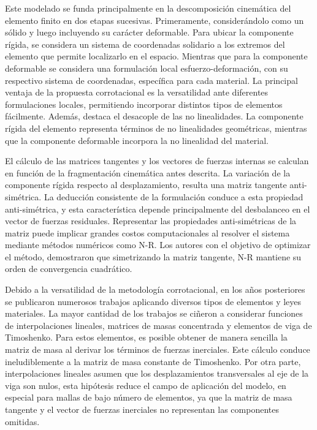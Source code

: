 Este modelado se funda principalmente en la descomposición cinemática del elemento finito en dos etapas sucesivas. Primeramente, considerándolo como un sólido y luego incluyendo su carácter deformable. Para ubicar la componente rígida, se considera un sistema de coordenadas solidario a los extremos del elemento que permite localizarlo en el espacio. Mientras que para la componente deformable se considera una formulación local esfuerzo-deformación, con su respectivo sistema de coordenadas, específica para cada material. La principal ventaja de la propuesta corrotacional es la versatilidad ante diferentes formulaciones locales, permitiendo incorporar distintos tipos de elementos fácilmente. Además, destaca el desacople de las no linealidades. La componente rígida del elemento representa términos de no linealidades geométricas, mientras que la componente deformable incorpora la no linealidad del material. 

El cálculo de las matrices tangentes y los vectores de fuerzas internas se calculan en función de la fragmentación cinemática antes descrita. La variación de la componente rígida respecto al desplazamiento, resulta una matriz tangente anti-simétrica. La deducción consistente de la formulación conduce a esta propiedad anti-simétrica, y esta característica depende principalmente del desbalanceo en el vector de fuerzas residuales. Representar las propiedades anti-simétricas de la matriz puede implicar grandes costos computacionales al resolver el sistema mediante métodos numéricos como \gls{N-R}. Los autores \cite{Nour-Omid1991} con el objetivo de optimizar el método, demostraron que simetrizando la matriz tangente, N-R mantiene su orden de convergencia cuadrático.

Debido a la versatilidad de la metodología corrotacional, en los años posteriores se publicaron numerosos trabajos aplicando diversos tipos de elementos y leyes materiales. La mayor cantidad de los trabajos se ciñeron a considerar funciones de interpolaciones lineales, matrices de masas concentrada y elementos de viga de Timoshenko. Para estos elementos, es posible obtener de manera sencilla la matriz de masa al derivar los términos de fuerzas inerciales. Este cálculo conduce ineludiblemente a la matriz de masa constante de Timoshenko. 
Por otra parte, interpolaciones lineales asumen que los desplazamientos transversales al eje de la viga son nulos, esta hipótesis reduce el campo de aplicación del modelo, en especial para mallas de bajo número de elementos, ya que la matriz de masa tangente y el vector de fuerzas inerciales no representan las componentes omitidas. 

